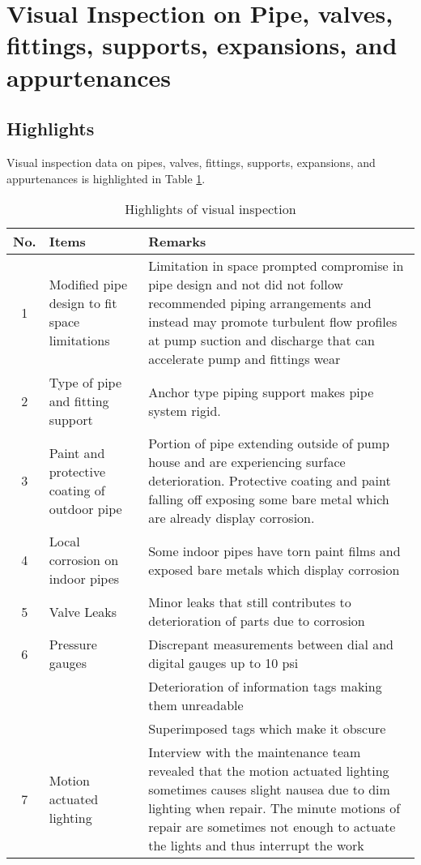 %
\section{Visual Inspection on Pipe, valves, fittings, supports, expansions, and appurtenances} \label{ch04mech02}


\subsection{Highlights} \label{ch04mech02_highlight}

Visual inspection data on pipes, valves, fittings, supports, expansions, and appurtenances is highlighted in Table \ref{ch04_visualinspection01}.

\begin{table}[!htb]
	\caption{Highlights of visual inspection}
	\label{ch04_visualinspection01}
	{\scriptsize

\begin{tabular}{c|p{3cm}|p{9.5cm}}
	\hline
	No. & Items & Remarks \\ 
	\hline
	1 & Modified pipe design to fit space limitations & Limitation in space prompted compromise in pipe design and not did not follow recommended piping arrangements and instead may promote turbulent flow profiles at pump suction and discharge that can accelerate pump and fittings wear \\ 
	2 & Type of pipe and fitting support & Anchor type piping support makes pipe system rigid. \\ 
	3 & Paint and protective coating of outdoor pipe & Portion of pipe extending outside of pump house and are experiencing surface deterioration. Protective coating and paint falling off exposing some bare metal which are already display corrosion. \\ 
	4 & Local corrosion on indoor pipes & Some indoor pipes have torn paint films and exposed bare metals which display corrosion \\ 
	5 & Valve Leaks & Minor leaks that still contributes to deterioration of parts due to corrosion \\ 
	6 & Pressure gauges & Discrepant measurements between dial and digital gauges up to 10 psi \\ 
	&  & Deterioration of information tags making them unreadable \\ 
	&  & Superimposed tags which make it obscure \\ 
	7 & Motion actuated lighting & Interview with the maintenance team revealed that the motion actuated lighting sometimes causes slight nausea due to dim lighting when repair. The minute motions of repair are sometimes not enough to actuate the lights and thus interrupt the work \\ 
	\hline
\end{tabular}

	}%
\end{table}

